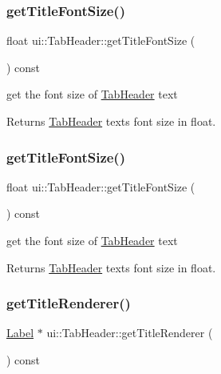 \subsubsection{\texorpdfstring{get\+Title\+Font\+Size()}{getTitleFontSize()}\hspace{0.1cm}{\footnotesize\ttfamily [1/2]}}
{\footnotesize\ttfamily float ui\+::\+Tab\+Header\+::get\+Title\+Font\+Size (\begin{DoxyParamCaption}{ }\end{DoxyParamCaption}) const}

get the font size of \hyperlink{classui_1_1TabHeader}{Tab\+Header} text \begin{DoxyReturn}{Returns}
\hyperlink{classui_1_1TabHeader}{Tab\+Header} text\textquotesingle{}s font size in float. 
\end{DoxyReturn}
\mbox{\label{classui_1_1TabHeader_acc9946cbc737165413b60f73c6a28bf9}} 
\subsubsection{\texorpdfstring{get\+Title\+Font\+Size()}{getTitleFontSize()}\hspace{0.1cm}{\footnotesize\ttfamily [2/2]}}
{\footnotesize\ttfamily float ui\+::\+Tab\+Header\+::get\+Title\+Font\+Size (\begin{DoxyParamCaption}{ }\end{DoxyParamCaption}) const}

get the font size of \hyperlink{classui_1_1TabHeader}{Tab\+Header} text \begin{DoxyReturn}{Returns}
\hyperlink{classui_1_1TabHeader}{Tab\+Header} text\textquotesingle{}s font size in float. 
\end{DoxyReturn}
\mbox{\label{classui_1_1TabHeader_a1df4f907b0f560450d391daa7b69b7f4}} 
\subsubsection{\texorpdfstring{get\+Title\+Renderer()}{getTitleRenderer()}\hspace{0.1cm}{\footnotesize\ttfamily [1/2]}}
{\footnotesize\ttfamily \hyperlink{classLabel}{Label} $\ast$ ui\+::\+Tab\+Header\+::get\+Title\+Renderer (\begin{DoxyParamCaption}{ }\end{DoxyParamCaption}) const}

